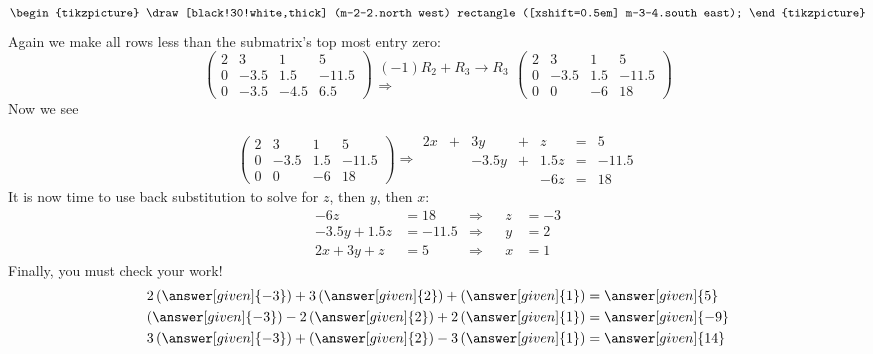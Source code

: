\documentclass{ximera}
\begin{document}
\begin{example}
\begin{explanation}
\[\begin{tikzpicture}
  \draw[black!30!white,thick] (m-2-2.north west) rectangle ([xshift=0.5em] m-3-4.south east);
\end{tikzpicture}
\]
Again we make all rows less than the submatrix's top most entry zero:
\[
\left(\begin{array}{ccc|c}
  2 & 3 & 1 & 5 \\
  0 & -3.5 & 1.5 &-11.5 \\
  0 & -3.5 & -4.5 & 6.5
\end{array}\right)
\begin{array}{c}
  \scriptstyle(-1) R_2+R_3\to R_3\\ \Longrightarrow
\end{array}
\left(\begin{array}{ccc|c}
  2 & 3 & 1 & 5 \\
  0 & -3.5 & 1.5 &-11.5 \\
  0 & 0    & -6 & 18
\end{array}\right)
\]
Now we see

\[
\left(\begin{array}{ccc|c}
  2 & 3 & 1 & 5 \\
  0 & -3.5 & 1.5 &-11.5 \\
  0 & 0    & -6 & 18
\end{array}\right)
\Rightarrow
\begin{array}{ccccccc}
     2x  &+ & 3y &+& z &=& 5 \\
     &  &-3.5y&+&1.5z&=&-11.5\\
     & & & &-6z&=&18
\end{array}
\]
It is now time to use back substitution to solve for $z$, then $y$, then $x$:
\begin{align*}
  -6z &= 18   &\Rightarrow & & z &= -3\\
  -3.5y+1.5z &=-11.5 &\Rightarrow & & y &= 2\\
  2x  +  3y + z &= 5 &\Rightarrow & & x &= 1
\end{align*}
Finally, you must check your work!
  \begin{align*}
    2\left(\answer[given]{-3}\right)+ 3\left(\answer[given]{2}\right) + \left(\answer[given]{1}\right)  &= \answer[given]{5} \\
    \left(\answer[given]{-3}\right) -2\left(\answer[given]{2}\right)+ 2\left(\answer[given]{1}\right) &=\answer[given]{-9}\\
    3\left(\answer[given]{-3}\right) +\left(\answer[given]{2}\right)- 3\left(\answer[given]{1}\right) &=\answer[given]{14}
  \end{align*}


\end{explanation}
\end{example}
\end{document}
